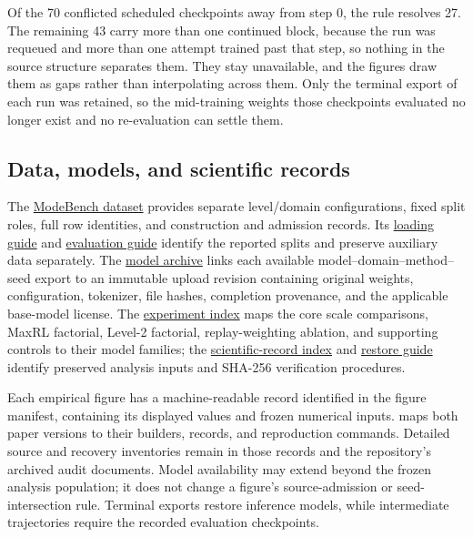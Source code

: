 \documentclass{article}
\newcommand{\1}{\mathbf 1}
\theoremstyle{remark}
\theoremstyle{definition}
\theoremstyle{plain}
\begin{document}
Of the 70 conflicted scheduled checkpoints away from step 0, the rule resolves
27. The remaining 43 carry more than one continued block, because the run was
requeued and more than one attempt trained past that step, so nothing in the
source structure separates them. They stay unavailable, and the figures draw
them as gaps rather than interpolating across them. Only the terminal export of
each run was retained, so the mid-training weights those checkpoints evaluated
no longer exist and no re-evaluation can settle them.

\subsection{Data, models, and scientific records}
\label{app:repro-artifacts}
\label{app:repro-code}
\label{app:archived-models}

The \href{https://huggingface.co/datasets/od2961/ModeBench}{ModeBench dataset}
provides separate level/domain configurations, fixed split roles, full row
identities, and construction and admission records. Its
\href{https://huggingface.co/datasets/od2961/ModeBench\#loading}{loading guide}
and \href{https://huggingface.co/datasets/od2961/ModeBench\#evaluation}{evaluation guide}
identify the reported splits and preserve auxiliary data separately.
The \href{https://huggingface.co/od2961/maxent-grpo-models}{model archive}
links each available model--domain--method--seed export to an immutable
upload revision containing original weights, configuration, tokenizer,
file hashes, completion provenance, and the applicable base-model license.
The \href{https://huggingface.co/od2961/maxent-grpo-models/blob/main/EXPERIMENTS.md}{experiment index}
maps the core scale comparisons, MaxRL factorial, Level-2 factorial,
replay-weighting ablation, and supporting controls to their model families;
the \href{https://huggingface.co/od2961/maxent-grpo-models/blob/main/DATA.md}{scientific-record index}
and \href{https://huggingface.co/od2961/maxent-grpo-models/blob/main/RESTORE.md}{restore guide}
identify preserved analysis inputs and SHA-256 verification procedures.

Each empirical figure has a machine-readable record identified in the
figure manifest, containing its displayed values and frozen numerical inputs.
 maps both paper versions to their builders,
records, and reproduction commands. Detailed source and recovery inventories
remain in those records and the repository's archived audit documents.
Model availability may extend beyond the frozen analysis population; it
does not change a figure's source-admission or seed-intersection rule.
Terminal exports restore inference models, while intermediate trajectories
require the recorded evaluation checkpoints.
\end{document}
